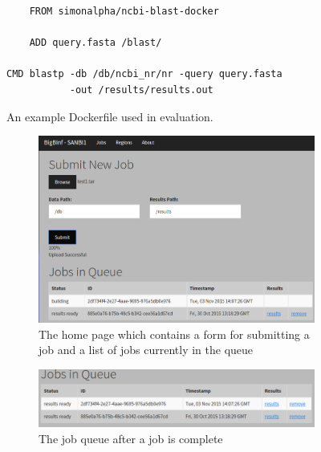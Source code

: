 \documentclass{sig-alternate-05-2015}
\begin{document}
\begin{figure}
	\begin{verbatim}
	FROM simonalpha/ncbi-blast-docker

	ADD query.fasta /blast/

CMD blastp -db /db/ncbi_nr/nr -query query.fasta 
           -out /results/results.out
	\end{verbatim}
	\caption{An example Dockerfile used in evaluation.}
\label{fig:dockerfile}
\end{figure}

\begin{figure}[t!]
\centering
	\begin{subfigure}[h]{.9\textwidth}
		\includegraphics[width=\textwidth]{img/screenshot2.png}
		\caption{The home page which contains a form for submitting a job and a list of jobs currently in the queue}
		\label{fig:screenshot2}
	\end{subfigure}
	\begin{subfigure}[h]{.9\textwidth}
		\includegraphics[width=\textwidth]{img/screenshotjobqueue2.png}
		\caption{The job queue after a job is complete}
		\label{fig:screenshotjobqueue}
	\end{subfigure}
	\begin{subfigure}[h]{.5\textwidth}

\end{subfigure}
\end{figure}
\end{document}
